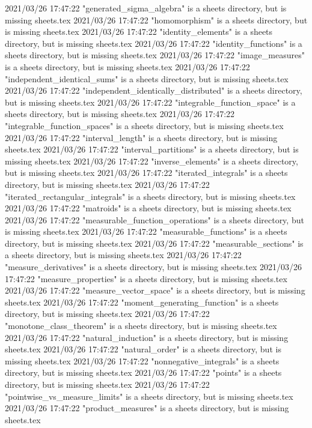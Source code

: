 2021/03/26 17:47:22 "generated_sigma_algebra" is a sheets directory, but is missing sheets.tex
2021/03/26 17:47:22 "homomorphism" is a sheets directory, but is missing sheets.tex
2021/03/26 17:47:22 "identity_elements" is a sheets directory, but is missing sheets.tex
2021/03/26 17:47:22 "identity_functions" is a sheets directory, but is missing sheets.tex
2021/03/26 17:47:22 "image_measures" is a sheets directory, but is missing sheets.tex
2021/03/26 17:47:22 "independent_identical_sums" is a sheets directory, but is missing sheets.tex
2021/03/26 17:47:22 "independent_identically_distributed" is a sheets directory, but is missing sheets.tex
2021/03/26 17:47:22 "integrable_function_space" is a sheets directory, but is missing sheets.tex
2021/03/26 17:47:22 "integrable_function_spaces" is a sheets directory, but is missing sheets.tex
2021/03/26 17:47:22 "interval_length" is a sheets directory, but is missing sheets.tex
2021/03/26 17:47:22 "interval_partitions" is a sheets directory, but is missing sheets.tex
2021/03/26 17:47:22 "inverse_elements" is a sheets directory, but is missing sheets.tex
2021/03/26 17:47:22 "iterated_integrals" is a sheets directory, but is missing sheets.tex
2021/03/26 17:47:22 "iterated_rectangular_integrals" is a sheets directory, but is missing sheets.tex
2021/03/26 17:47:22 "matroids" is a sheets directory, but is missing sheets.tex
2021/03/26 17:47:22 "measurable_function_operations" is a sheets directory, but is missing sheets.tex
2021/03/26 17:47:22 "measurable_functions" is a sheets directory, but is missing sheets.tex
2021/03/26 17:47:22 "measurable_sections" is a sheets directory, but is missing sheets.tex
2021/03/26 17:47:22 "measure_derivatives" is a sheets directory, but is missing sheets.tex
2021/03/26 17:47:22 "measure_properties" is a sheets directory, but is missing sheets.tex
2021/03/26 17:47:22 "measure_vector_space" is a sheets directory, but is missing sheets.tex
2021/03/26 17:47:22 "moment_generating_function" is a sheets directory, but is missing sheets.tex
2021/03/26 17:47:22 "monotone_class_theorem" is a sheets directory, but is missing sheets.tex
2021/03/26 17:47:22 "natural_induction" is a sheets directory, but is missing sheets.tex
2021/03/26 17:47:22 "natural_order" is a sheets directory, but is missing sheets.tex
2021/03/26 17:47:22 "nonnegative_integrals" is a sheets directory, but is missing sheets.tex
2021/03/26 17:47:22 "points" is a sheets directory, but is missing sheets.tex
2021/03/26 17:47:22 "pointwise_vs_measure_limits" is a sheets directory, but is missing sheets.tex
2021/03/26 17:47:22 "product_measures" is a sheets directory, but is missing sheets.tex
